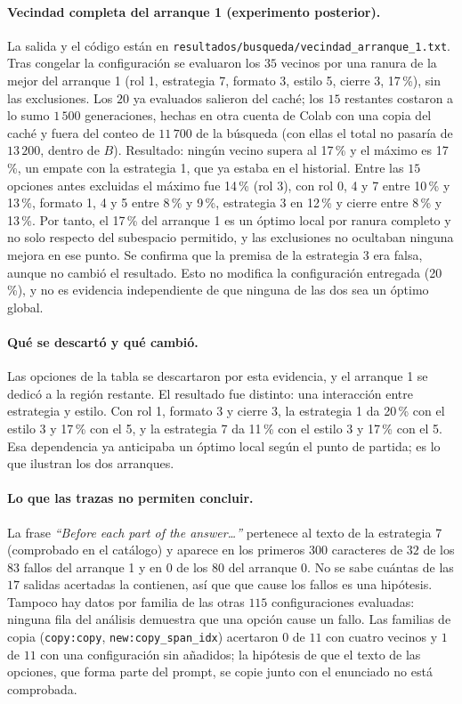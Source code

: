 \paragraph{Vecindad completa del arranque 1 (experimento posterior).} La salida y el código
están en \texttt{resultados/busqueda/vecindad\_arranque\_1.txt}. Tras congelar la
configuración se evaluaron los $35$ vecinos por una ranura de la mejor del arranque 1
(rol 1, estrategia 7, formato 3, estilo 5, cierre 3, 17\,\%), sin las exclusiones. Los $20$
ya evaluados salieron del caché; los $15$ restantes costaron a lo sumo $1\,500$ generaciones,
hechas en otra cuenta de Colab con una copia del caché y fuera del conteo de $11\,700$ de la
búsqueda (con ellas el total no pasaría de $13\,200$, dentro de $B$). Resultado:
ningún vecino supera al 17\,\% y el máximo es 17\,\%, un empate con la estrategia 1, que ya
estaba en el historial. Entre las $15$ opciones antes excluidas el máximo fue 14\,\%
(rol 3), con rol 0, 4 y 7 entre 10\,\% y 13\,\%, formato 1, 4 y 5 entre 8\,\% y 9\,\%,
estrategia 3 en 12\,\% y cierre entre 8\,\% y 13\,\%. Por tanto, el 17\,\% del arranque 1
es un óptimo local por ranura completo y no solo respecto del subespacio permitido, y las
exclusiones no ocultaban ninguna mejora en ese punto. Se confirma que la premisa de la
estrategia 3 era falsa, aunque no cambió el resultado. Esto no modifica la configuración
entregada (20\,\%), y no es evidencia independiente de que ninguna de las dos sea un
óptimo global.

\paragraph{Qué se descartó y qué cambió.} Las opciones de la tabla se descartaron por esta
evidencia, y el arranque 1 se dedicó a la región restante. El resultado fue distinto: una
interacción entre estrategia y estilo. Con rol 1, formato 3 y cierre 3, la estrategia 1 da
20\,\% con el estilo 3 y 17\,\% con el 5, y la estrategia 7 da 11\,\% con el estilo 3
y 17\,\% con el 5. Esa dependencia ya anticipaba un óptimo local según el punto de
partida; es lo que ilustran los dos arranques.

\paragraph{Lo que las trazas no permiten concluir.} La frase \emph{``Before each part of the
answer\dots''} pertenece al texto de la estrategia 7 (comprobado en el catálogo) y aparece
en los primeros $300$ caracteres de $32$ de los $83$ fallos del arranque 1 y en $0$ de los
$80$ del arranque 0. No se sabe cuántas de las $17$ salidas acertadas la contienen, así que
que cause los fallos es una hipótesis. Tampoco hay datos por familia de las otras $115$
configuraciones evaluadas: ninguna fila del análisis demuestra que una opción cause un
fallo. Las familias de copia (\texttt{copy:copy}, \texttt{new:copy\_span\_idx}) acertaron
$0$ de $11$ con cuatro vecinos y $1$ de $11$ con una configuración sin añadidos; la
hipótesis de que el texto de las opciones, que forma parte del prompt, se copie junto con
el enunciado no está comprobada.

